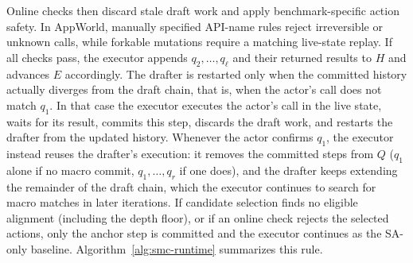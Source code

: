 Online checks then discard stale draft work and apply benchmark-specific action safety. In AppWorld, manually specified API-name rules reject irreversible or unknown calls, while forkable mutations require a matching live-state replay. If all checks pass, the executor appends $q_2,\ldots,q_\ell$ and their returned results to $H$ and advances $E$ accordingly.
The drafter is restarted only when the committed history actually diverges from the draft chain, that is, when the actor's call does not match $q_1$. 
In that case the executor executes the actor's call in the live state, waits for its result, commits this step, discards the draft work, and restarts the drafter from the updated history. Whenever the actor confirms $q_1$, the executor instead reuses the drafter's execution: it removes the committed steps from $Q$ ($q_1$ alone if no macro commit, $q_1,\ldots,q_r$ if one does), and the drafter keeps extending the remainder of the draft chain, which the executor
continues to search for macro matches in later iterations. 
If candidate selection finds no eligible alignment (including the depth floor), or if an online check rejects the selected actions, only the anchor step is committed and the executor continues as the SA-only baseline.
Algorithm~\ref{alg:smc-runtime} summarizes this rule.



